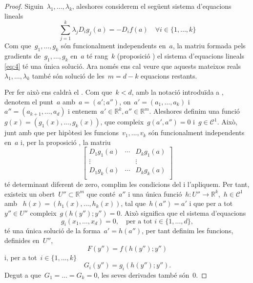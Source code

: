 \documentclass[../../main.tex]{subfiles}
\begin{document}
    \begin{proof}
        Siguin~\(\lambda_{1},\dots,\lambda_{k}\), aleshores considerem el següent sistema d'equacions lineals
        \begin{equation}\label{eq:4}
        \sum_{j=1}^{k}\lambda_{j}D_{i}g_{j}(a)=-D_{i}f(a)\quad\forall i\in\{1,\dots,k\}
        \end{equation}
        Com que~\(g_{1},\dots,g_{k}\) són funcionalment independents en~\(a\), la matriu formada pels gradients de~\(g_{1},\dots,g_{k}\) en~\(a\) té rang~\(k\) (proposició ) el sistema d'equacions lineals \eqref{eq:4} té una única solució.
        Ara només ens cal veure que aquests mateixos reals~\(\lambda_{1},\dots,\lambda_{k}\) també són solució de les~\(m=d-k\) equacions restants.

        Per fer això ens caldrà el .
        Com que~\(k<d\), amb la notació introduïda a , denotem el punt~\(a\) amb~\(a=(a';a'')\), on~\(a'=(a_{1},\dots,a_{k})\) i~\(a''=(a_{k+1},\dots,a_{d})\) i entenem~\(a'\in\mathbb{R}^{k},a''\in\mathbb{R}^{m}\).
        Aleshores definim una funció~\(g(x)=(g_{1}(x),\dots,g_{k}(x))\), que compleix~\(g(a',a'')=0\) i~\(g\in\mathcal{C}^{1}\).
        Això, junt amb que per hipòtesi les funcions~\(v_{1},\dots,v_{k}\) són funcionalment independents en~\(a\) i, per la proposició , la matriu
        \[\left[\begin{matrix}
        D_{1}g_{1}(a) & \cdots & D_{k}g_{1}(a)\\
        \vdots & & \vdots\\
        D_{1}g_{k}(a) & \cdots & D_{k}g_{k}(a)\\
        \end{matrix}\right]\]
        té determinant diferent de zero, complim les condicions del  i l'apliquem.
        Per tant, existeix un obert~\(U''\subset\mathbb{R}^{m}\) que conté~\(a''\) i una única funció~\(h\colon U''\to\mathbb{R}^{k}\),~\(h\in\mathcal{C}^{1}\) amb ~\(h(x)=(h_{1}(x),\dots,h_{k}(x))\), tal que~\(h(a'')=a'\) i que per a tot~\(y''\in U''\) compleix~\(g(h(y'');y'')=0\).
        Això significa que el sistema d'equacions
        \[
            g_{i}(x_{1},\dots,x_{d})=0,\quad\text{per a tot }i\in\{1,\dots,d\},
        \]
        té una única solució de la forma~\(a'=h(a'')\), per tant definim les funcions, definides en~\(U''\),
        \[
            F(y'')=f(h(y'');y'')
        \]
        i, per a tot~\(i\in\{1,\dots,k\}\)
        \[
            G_{i}(y'')=g_{i}(h(y'');y'').
        \]
        Degut a que~\(G_{1}=\dots=G_{k}=0\), les seves derivades també són~\(0\).
    \end{proof}
\end{document}
